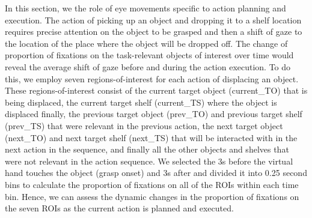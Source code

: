 
In this section, we the role of eye movements specific to action planning and execution. The action of picking up an object and dropping it to a shelf location requires precise attention on the object to be grasped and then a shift of gaze to the location of the place where the object will be dropped off. The change of proportion of fixations on the task-relevant objects of interest over time would reveal the average shift of gaze before and during the action execution. To do this, we employ seven regions-of-interest for each action of displacing an object. These regions-of-interest consist of the current target object (current\_TO) that is being displaced, the current target shelf (current\_TS) where the object is displaced finally, the previous target object (prev\_TO) and previous target shelf (prev\_TS) that were relevant in the previous action, the next target object (next\_TO) and next target shelf (next\_TS) that will be interacted with in the next action in the sequence, and finally all the other objects and shelves that were not relevant in the action sequence. We selected the 3s before the virtual hand touches the object (grasp onset) and 3s after and divided it into 0.25 second bins to calculate the proportion of fixations on all of the ROIs within each time bin. Hence, we can assess the dynamic changes in the proportion of fixations on the seven ROIs as the current action is planned and executed.

